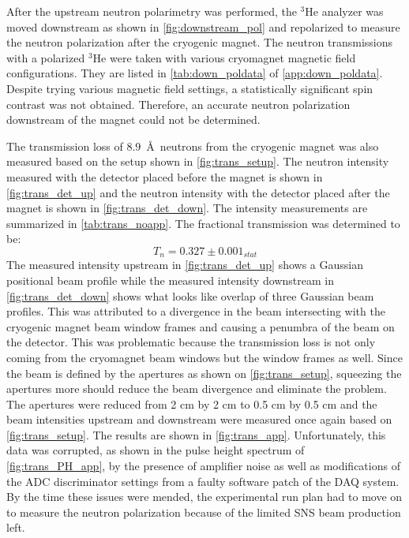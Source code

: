 After the upstream neutron polarimetry was performed, the $^3$He analyzer was moved downstream as shown in \cref{fig:downstream_pol} and repolarized to measure the neutron polarization after the cryogenic magnet. The neutron transmissions with a polarized $^3$He were taken with various cryomagnet magnetic field configurations. They are listed in \cref{tab:down_poldata} of \cref{app:down_poldata}. Despite trying various magnetic field settings, a statistically significant spin contrast was not obtained. Therefore, an accurate neutron polarization downstream of the magnet could not be determined. 

The transmission loss of 8.9~\AA\ neutrons from the cryogenic magnet was also measured based on the setup shown in \cref{fig:trans_setup}. The neutron intensity measured with the detector placed before the magnet is shown in \cref{fig:trans_det_up} and the neutron intensity with the detector placed after the magnet is shown in \cref{fig:trans_det_down}. The intensity measurements are summarized in \cref{tab:trans_noapp}. The fractional transmission was determined to be:
\begin{equation}
    T_n = 0.327 \pm 0.001_{stat}
\end{equation}
The measured intensity upstream in \cref{fig:trans_det_up} shows a Gaussian positional beam profile while the measured intensity downstream in \cref{fig:trans_det_down} shows what looks like overlap of three Gaussian beam profiles. This was attributed to a divergence in the beam intersecting with the cryogenic magnet beam window frames and causing a penumbra of the beam on the detector. This was problematic because the transmission loss is not only coming from the cryomagnet beam windows but the window frames as well. Since the beam is defined by the apertures as shown on \cref{fig:trans_setup}, squeezing the apertures more should reduce the beam divergence and eliminate the problem. The apertures were reduced from 2 cm by 2 cm to 0.5 cm by 0.5 cm and the beam intensities upstream and downstream were measured once again based on \cref{fig:trans_setup}.  The results are shown in \cref{fig:trans_app}. Unfortunately, this data was corrupted, as shown in the pulse height spectrum of \cref{fig:trans_PH_app}, by the presence of amplifier noise as well as modifications of the ADC discriminator settings from a faulty software patch of the DAQ system. By the time these issues were mended, the experimental run plan had to move on to measure the neutron polarization because of the limited SNS beam production left.     



